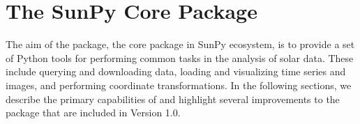 \section{The SunPy Core Package}
\label{sec:sunpycore}

The aim of the \sunpypkg package, the core package in SunPy ecosystem, is to provide a set of Python tools for performing common tasks in the analysis of solar data.
These include querying and downloading data, loading and visualizing time series and images, and performing coordinate transformations.
In the following sections, we describe the primary capabilities of \sunpypkg and highlight several improvements to the package that are included in Version 1.0.
